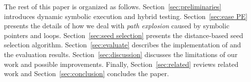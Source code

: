 
The rest of this paper is organized as follows.
Section~\ref{sec:preliminaries} introduces dynamic symbolic execution
and hybrid testing. Section~\ref{sec:ease PE} presents the details of
how we deal with \textit{path explosion} caused by symbolic pointers
and loops. Section~\ref{sec:seed selection} presents the distance-based
seed selection algorithm. Section~\ref{sec:evaluate} describes the
implementation of \prototype and the evaluation results.
Section~\ref{sec:discussion} discusses the limitations of our work and
possible improvements. Finally, Section~\ref{sec:related} reviews
related work and Section~\ref{sec:conclusion} concludes the paper.
